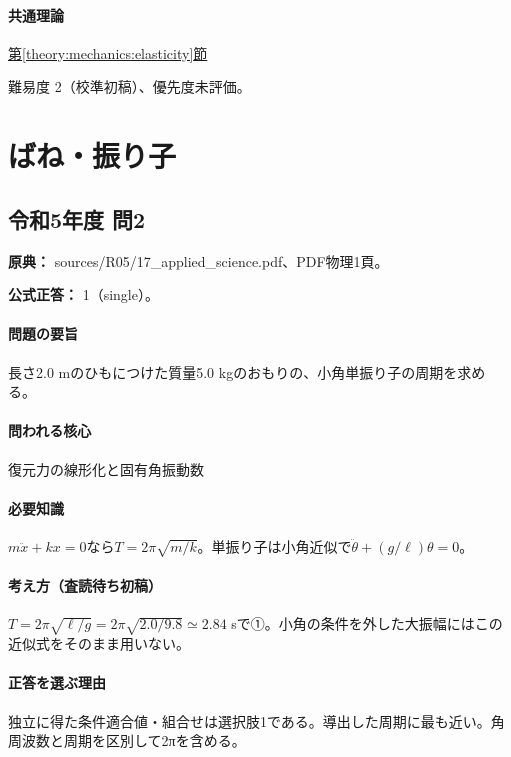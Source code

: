 \paragraph{共通理論} \hyperref[theory:mechanics:elasticity]{第\ref*{theory:mechanics:elasticity}節}

\par 難易度 2（校準初稿）、優先度未評価。

\section{ばね・振り子}

\subsection{令和5年度 問2}
\label{q:r05-reg-applied-02}

\noindent\textbf{原典：} sources/R05/17\_applied\_science.pdf、PDF物理1頁。

\textbf{公式正答：} 1（single）。

\paragraph{問題の要旨} 長さ2.0 mのひもにつけた質量5.0 kgのおもりの、小角単振り子の周期を求める。

\paragraph{問われる核心} 復元力の線形化と固有角振動数

\paragraph{必要知識} \(m\ddot x+kx=0\)なら\(T=2\pi\sqrt{m/k}\)。単振り子は小角近似で\(\ddot\theta+(g/\ell)\theta=0\)。

\paragraph{考え方（査読待ち初稿）} \(T=2\pi\sqrt{\ell/g}=2\pi\sqrt{2.0/9.8}\simeq2.84\) sで①。小角の条件を外した大振幅にはこの近似式をそのまま用いない。

\paragraph{正答を選ぶ理由} 独立に得た条件適合値・組合せは選択肢1である。導出した周期に最も近い。角周波数と周期を区別して2πを含める。

